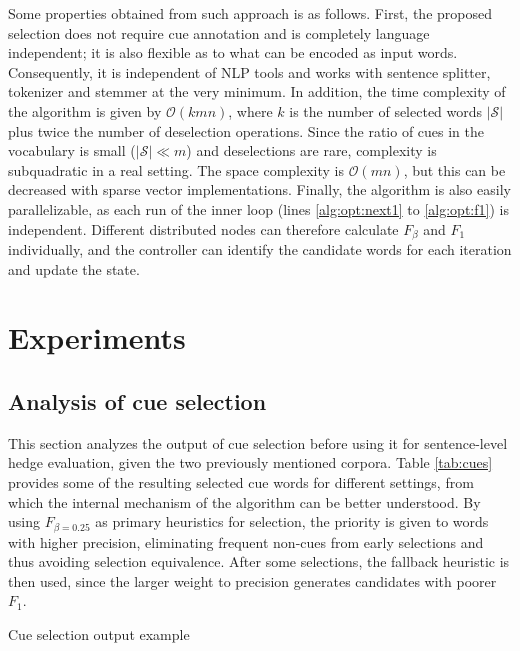 \documentclass[english]{jnlp_1.4}
\begin{document}
Some properties obtained from such approach is as follows. First, the proposed selection does not require cue annotation and is completely language independent; it is also flexible as to what can be encoded as input words. Consequently, it is independent of NLP tools and works with sentence splitter, tokenizer and stemmer at the very minimum. In addition, the time complexity of the algorithm is given by $\mathcal{O}(kmn)$, where $k$ is the number of selected words $|\mathcal{S}|$ plus twice the number of deselection operations. Since the ratio of cues in the vocabulary is small ($|\mathcal{S}| \ll m$) and deselections are rare, complexity is subquadratic in a real setting. The space complexity is $\mathcal{O}(mn)$, but this can be decreased with sparse vector implementations. Finally, the algorithm is also easily parallelizable, as each run of the inner loop (lines \ref{alg:opt:next1} to \ref{alg:opt:f1}) is independent. Different distributed nodes can therefore calculate $F_{\beta}$ and $F_1$ individually, and the controller can identify the candidate words for each iteration and update the state.



\section{Experiments}
\label{sec:experiments}

\subsection{Analysis of cue selection}

This section analyzes the output of cue selection before using it for sentence-level hedge evaluation, given the two previously mentioned corpora. Table \ref{tab:cues} provides some of the resulting selected cue words for different settings, from which the internal mechanism of the algorithm can be better understood. By using $F_{\beta = 0.25}$ as primary heuristics for selection, the priority is given to words with higher precision, eliminating frequent non-cues from early selections and thus avoiding selection equivalence. After some selections, the fallback heuristic is then used, since the larger weight to precision generates candidates with poorer $F_1$.

\begin{table}[t]
\caption{Cue selection output example}
\label{tab:cues}

\end{table}
\end{document}
